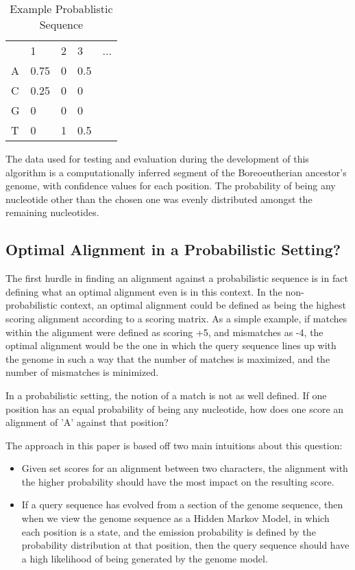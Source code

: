 \documentclass[12pt, conference]{IEEEtran}
\begin{document}
\begin{table}[htbp]
\centering
\caption{Example Probablistic Sequence}
\label{exprob}
\begin{tabular}{lllll}
  & 1    & 2 & 3   & ... \\
A & 0.75 & 0 & 0.5 &     \\
C & 0.25 & 0 & 0   &     \\
G & 0    & 0 & 0   &     \\
T & 0    & 1 & 0.5 &    
\end{tabular}
\end{table}

	The data used for testing and evaluation during the development of this algorithm is a computationally inferred segment of the Boreoeutherian ancestor's genome, with confidence values for each position. The probability of being any nucleotide other than the chosen one was evenly distributed amongst the remaining nucleotides.

	\subsection{\textbf{Optimal Alignment in a Probabilistic Setting?}}
	
	The first hurdle in finding an alignment against a probabilistic sequence is in fact defining what an optimal alignment even is in this context. In the non-probabilistic context, an optimal alignment could be defined as being the highest scoring alignment according to a scoring matrix. As a simple example, if matches within the alignment were defined as scoring +5, and mismatches as -4, the optimal alignment would be the one in which the query sequence lines up with the genome in such a way that the number of matches is maximized, and the number of mismatches is minimized.
	
	In a probabilistic setting, the notion of a match is not as well defined. If one position has an equal probability of being any nucleotide, how does one score an alignment of 'A' against that position?
	
	The approach in this paper is based off two main intuitions about this question:
	
	\begin{itemize}
		\item Given set scores for an alignment between two characters, the alignment with the higher probability should have the most impact on the resulting score.
		\item If a query sequence has evolved from a section of the genome sequence, then when we view the genome sequence as a Hidden Markov Model, in which each position is a state, and the emission probability is defined by the probability distribution at that position, then the query sequence should have a high likelihood of being generated by the genome model.
	\end{itemize}
\end{document}
